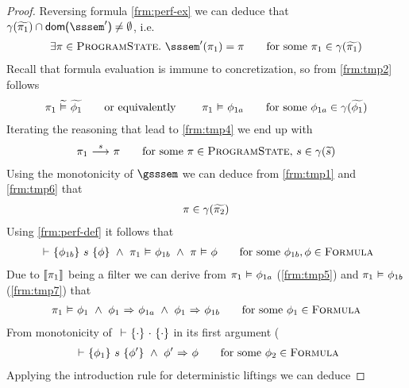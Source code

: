 \begin{proof}
    Reversing formula \ref{frm:perf-ex} we can deduce that $\gamma(\grad{\pi_1}) \cap \dom{\sssem'} \neq \emptyset$, i.e.
    \begin{align}
    \label{frm:tmp4}
    \exists \pi \in \setProgramState.~ \sssem'(\pi_1) = \pi 
    \quad\quad\text{for some } \pi_1 \in \gamma(\grad{\pi_1})
    \end{align}
    Recall that formula evaluation is immune to concretization, so from \ref{frm:tmp2} follows
    \begin{align}
    \label{frm:tmp5}
    \evalgphiGen{\pi_1}{\grad{\phi_1}}
    \text{\quad\quad or equivalently \quad\quad}
    \evalphiGen{\pi_1}{\phi_{1a}}
    \quad\quad\text{for some } \phi_{1a} \in \gamma(\grad{\phi_1}) 
    \end{align}
    Iterating the reasoning that lead to \ref{frm:tmp4} we end up with
    \begin{align}
    \label{frm:tmp6}
    \sstepConsume{s}{\pi_1}{\pi}
    \quad\quad\text{for some } \pi \in \setProgramState,\, s \in \gamma(\grad{s}) 
    \end{align}
    Using the monotonicity of $\gsssem$ we can deduce from \ref{frm:tmp1} and \ref{frm:tmp6} that
    \begin{align}
    \label{frm:tmp6x}
    \pi \in \gamma(\grad{\pi_2})
    \end{align}
    Using \ref{frm:perf-def} it follows that
    \begin{align}
    \label{frm:tmp7}
    \thoare{}{\phi_{1b}}{s}{\phi} ~\wedge~ \evalphiGen{\pi_1}{\phi_{1b}} ~\wedge~ \evalphiGen{\pi}{\phi}
    \quad\quad\text{for some } \phi_{1b}, \phi \in \setFormula
    \end{align}
    Due to $\llbracket {\pi_1} \rrbracket$ being a filter we can derive from $\pi_1 \,\,{\vDash}\,\, \phi_{1a}$ (\ref{frm:tmp5}) and $\pi_1 \,\,{\vDash}\,\, \phi_{1b}$ (\ref{frm:tmp7}) that
    \begin{align}
    \label{frm:tmp8}
    \evalphiGen{\pi_1}{\phi_1} ~\wedge~ \phiImplies{\phi_1}{\phi_{1a}} ~\wedge~ \phiImplies{\phi_1}{\phi_{1b}}
    \quad\quad\text{for some } \phi_1 \in \setFormula
    \end{align}
    From monotonicity of ${} \,\,{\vdash}\,\, \{{\cdot}\} ~{\cdot}~ \{{\cdot}\}$ in its first argument (%
    \begin{align}
    \label{frm:tmp9}
    \thoare{}{\phi_1}{s}{\phi'} ~\wedge~ \phiImplies{\phi'}{\phi}
    \quad\quad\text{for some } \phi_2 \in \setFormula
    \end{align}
    Applying the introduction rule for deterministic liftings we can deduce

\end{proof}
